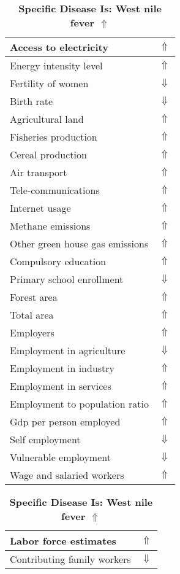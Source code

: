 \documentclass[12pt,notitlepage,oneside]{report}
\begin{document}
\clearpage
\begin{table}[!htb]
\caption{\textbf{Specific Disease Is: West nile fever $\Uparrow$}}
\centering
\label{Correlated Socio-economic Factors0}
\begin{tabular}{|l|l|}
\hline
Access to electricity & $\Uparrow$\\ \hline
Energy intensity level & $\Uparrow$\\ \hline
Fertility of women & $\Downarrow$\\ \hline
Birth rate & $\Downarrow$\\ \hline
Agricultural land & $\Uparrow$\\ \hline
Fisheries production & $\Uparrow$\\ \hline
Cereal production & $\Uparrow$\\ \hline
Air transport  & $\Uparrow$\\ \hline
Tele-communications & $\Uparrow$\\ \hline
Internet usage & $\Uparrow$\\ \hline
Methane emissions & $\Uparrow$\\ \hline
Other green house gas emissions & $\Uparrow$\\ \hline
Compulsory education & $\Uparrow$\\ \hline
Primary school enrollment & $\Downarrow$\\ \hline
Forest area & $\Uparrow$\\ \hline
Total area & $\Uparrow$\\ \hline
Employers & $\Uparrow$\\ \hline
Employment in agriculture & $\Downarrow$\\ \hline
Employment in industry & $\Uparrow$\\ \hline
Employment in services & $\Uparrow$\\ \hline
Employment to population ratio & $\Uparrow$\\ \hline
Gdp per person employed & $\Uparrow$\\ \hline
Self employment & $\Downarrow$\\ \hline
Vulnerable employment & $\Downarrow$\\ \hline
Wage and salaried workers & $\Uparrow$\\ \hline
\end{tabular}
\begin{tabular}{|l|l|}
\hline
Labor force estimates & $\Uparrow$\\ \hline
Contributing family workers & $\Downarrow$\\ \hline

\end{tabular}
\end{table}
\end{document}
